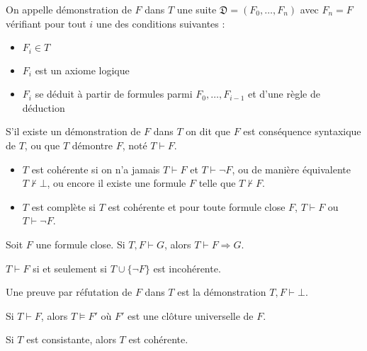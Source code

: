 \documentclass[9pt]{beamer}
\begin{document}
\begin{frame}
\begin{definition}
  On appelle démonstration de $F$ dans $T$ une suite $\mathfrak{D} = (F_0,\dots,F_n)$ avec $F_n = F$ vérifiant pour tout $i$ une des conditions suivantes :
  \begin{itemize}
  \item $F_i \in T$
  \item $F_i$ est un axiome logique
  \item $F_i$ se déduit à partir de formules parmi $F_0,\dots,F_{i-1}$ et d'une règle de déduction
  \end{itemize}
  S'il existe un démonstration de $F$ dans $T$ on dit que $F$ est conséquence syntaxique de $T$, ou que $T$ démontre $F$, noté $T \vdash F$.
\end{definition}

\begin{definition}
  \begin{itemize}
  \item $T$ est cohérente si on n'a jamais $T\vdash F$ et $T\vdash\neg F$, ou de manière équivalente $T\not\vdash\bot$, ou encore il existe une formule $F$ telle que $T\not\vdash F$.
  \item $T$ est complète si $T$ est cohérente et pour toute formule close $F$, $T\vdash F$ ou $T\vdash\neg F$.
  \end{itemize}
\end{definition}
\end{frame}

\begin{frame}
\begin{theorem}
  Soit $F$ une formule close. Si $T,F\vdash G$, alors $T\vdash F\Rightarrow G$.
\end{theorem}

\begin{corollary}
  $T\vdash F$ si et seulement si $T\cup\{\neg F\}$ est incohérente.
\end{corollary}
\end{frame}

\begin{frame}
\begin{definition}
  Une preuve par réfutation de $F$ dans $T$ est la démonstration $T,F\vdash\bot$.
\end{definition}

\begin{theorem}
  Si $T \vdash F$, alors $T \models F'$ où $F'$ est une clôture universelle de $F$.
\end{theorem}

\begin{corollary}
  Si $T$ est consistante, alors $T$ est cohérente.
\end{corollary}
\end{frame}
\end{document}
